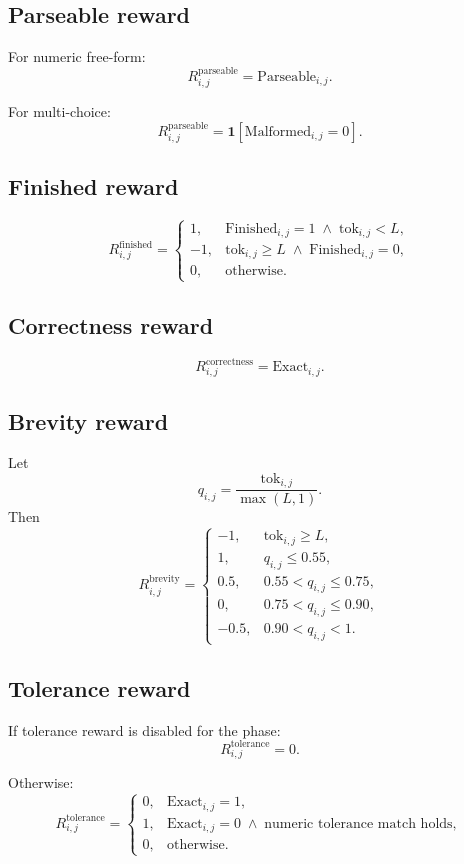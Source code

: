 \documentclass[11pt]{article}
\newcommand{\ind}{\mathbf{1}}
\begin{document}
\subsection*{Parseable reward}
For numeric free-form:
\[
R^{\mathrm{parseable}}_{i,j} = \mathrm{Parseable}_{i,j}.
\]

For multi-choice:
\[
R^{\mathrm{parseable}}_{i,j}
=
\ind\!\left[
\mathrm{Malformed}_{i,j}=0
\right].
\]

\subsection*{Finished reward}
\[
R^{\mathrm{finished}}_{i,j}
=
\begin{cases}
1, & \mathrm{Finished}_{i,j}=1 \;\wedge\; \mathrm{tok}_{i,j}<L, \\
-1, & \mathrm{tok}_{i,j}\ge L \;\wedge\; \mathrm{Finished}_{i,j}=0, \\
0, & \text{otherwise.}
\end{cases}
\]

\subsection*{Correctness reward}
\[
R^{\mathrm{correctness}}_{i,j} = \mathrm{Exact}_{i,j}.
\]

\subsection*{Brevity reward}
Let
\[
q_{i,j} = \frac{\mathrm{tok}_{i,j}}{\max(L,1)}.
\]
Then
\[
R^{\mathrm{brevity}}_{i,j}
=
\begin{cases}
-1, & \mathrm{tok}_{i,j} \ge L, \\
1, & q_{i,j} \le 0.55, \\
0.5, & 0.55 < q_{i,j} \le 0.75, \\
0, & 0.75 < q_{i,j} \le 0.90, \\
-0.5, & 0.90 < q_{i,j} < 1.
\end{cases}
\]

\subsection*{Tolerance reward}
If tolerance reward is disabled for the phase:
\[
R^{\mathrm{tolerance}}_{i,j} = 0.
\]

Otherwise:
\[
R^{\mathrm{tolerance}}_{i,j}
=
\begin{cases}
0, & \mathrm{Exact}_{i,j}=1, \\
1, & \mathrm{Exact}_{i,j}=0 \;\wedge\; \text{numeric tolerance match holds}, \\
0, & \text{otherwise.}
\end{cases}
\]
\end{document}

